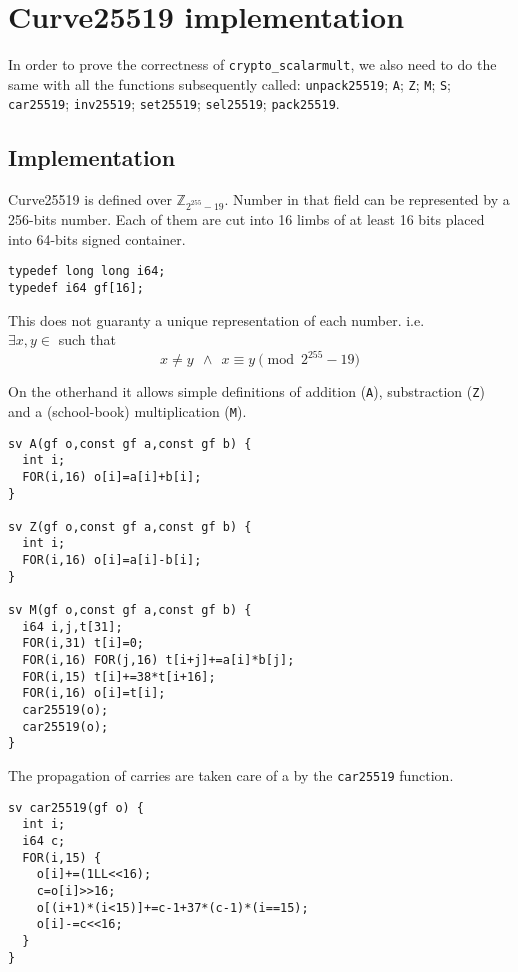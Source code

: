 \section{Curve25519 implementation}

In order to prove the correctness of \texttt{crypto\_scalarmult},
 we also need to do the same with all the functions subsequently called:
\texttt{unpack25519}; \texttt{A}; \texttt{Z}; \texttt{M}; \texttt{S};
\texttt{car25519}; \texttt{inv25519}; \texttt{set25519}; \texttt{sel25519};
\texttt{pack25519}.

\subsection{Implementation}

Curve25519 is defined over $\mathbb{Z}_{2^{255}-19}$. Number in that field can
be represented by a 256-bits number. Each of them are cut into 16 limbs of at
least 16 bits placed into 64-bits signed container.
\begin{lstlisting}[language=Ctweetnacl]
typedef long long i64;
typedef i64 gf[16];
\end{lstlisting}
This does not guaranty a unique representation of each number. i.e.\\
$\exists x,y \in$  such that
\vspace{-0.25cm}
  $$x \neq y\ \ \land\ \ x \equiv y \pmod{2^{255}-19}$$

On the otherhand it allows simple definitions of addition (\texttt{A}),
substraction (\texttt{Z}) and a (school-book) multiplication (\texttt{M}).
\begin{lstlisting}[language=Ctweetnacl]
sv A(gf o,const gf a,const gf b) {
  int i;
  FOR(i,16) o[i]=a[i]+b[i];
}

sv Z(gf o,const gf a,const gf b) {
  int i;
  FOR(i,16) o[i]=a[i]-b[i];
}

sv M(gf o,const gf a,const gf b) {
  i64 i,j,t[31];
  FOR(i,31) t[i]=0;
  FOR(i,16) FOR(j,16) t[i+j]+=a[i]*b[j];
  FOR(i,15) t[i]+=38*t[i+16];
  FOR(i,16) o[i]=t[i];
  car25519(o);
  car25519(o);
}
\end{lstlisting}

The propagation of carries are taken care of a by the \texttt{car25519} function.
\begin{lstlisting}[language=Ctweetnacl]
sv car25519(gf o) {
  int i;
  i64 c;
  FOR(i,15) {
    o[i]+=(1LL<<16);
    c=o[i]>>16;
    o[(i+1)*(i<15)]+=c-1+37*(c-1)*(i==15);
    o[i]-=c<<16;
  }
}
\end{lstlisting}


